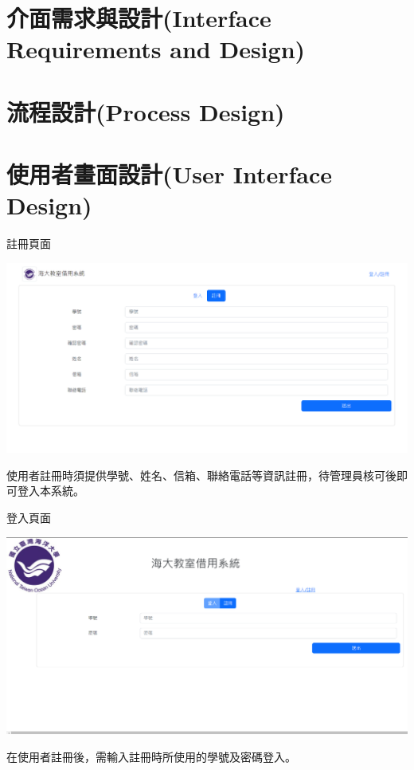 \documentclass{article}
\begin{document}
\newpage

\section[介面需求與設計(INTERFACE REQUIREMENTS AND DESIGN)]{介面需求與設計(Interface Requirements and Design)}

\newpage

\section[流程設計(PROCESS DESIGN)]{流程設計(Process Design)}

\newpage

\section[使用者畫面設計(USER INTERFACE DESIGN)]{使用者畫面設計(User Interface Design)}

	\bigskip
	\begin{Large}
		註冊頁面
	\end{Large}
	
	\begin{center}
		\includegraphics[height=0.35\textheight]{SDDRegister.png}
	\end{center}
	使用者註冊時須提供學號、姓名、信箱、聯絡電話等資訊註冊，待管理員核可後即可登入本系統。

	\bigskip
	\bigskip
	\begin{Large}
		登入頁面
	\end{Large}

	\begin{center}
		\includegraphics[height=0.35\textheight]{SDDLogin.png}
	\end{center}
	在使用者註冊後，需輸入註冊時所使用的學號及密碼登入。
\newpage
\end{document}
